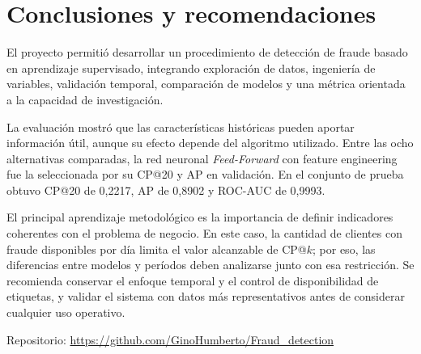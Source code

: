 \section{Conclusiones y recomendaciones}

El proyecto permitió desarrollar un procedimiento de detección de fraude basado en aprendizaje supervisado, integrando exploración de datos, ingeniería de variables, validación temporal, comparación de modelos y una métrica orientada a la capacidad de investigación.

La evaluación mostró que las características históricas pueden aportar información útil, aunque su efecto depende del algoritmo utilizado. Entre las ocho alternativas comparadas, la red neuronal \textit{Feed-Forward} con feature engineering fue la seleccionada por su CP@20 y AP en validación. En el conjunto de prueba obtuvo CP@20 de 0,2217, AP de 0,8902 y ROC-AUC de 0,9993.

El principal aprendizaje metodológico es la importancia de definir indicadores coherentes con el problema de negocio. En este caso, la cantidad de clientes con fraude disponibles por día limita el valor alcanzable de CP@$k$; por eso, las diferencias entre modelos y períodos deben analizarse junto con esa restricción. Se recomienda conservar el enfoque temporal y el control de disponibilidad de etiquetas, y validar el sistema con datos más representativos antes de considerar cualquier uso operativo.

\begin{nota}
    Repositorio: \url{https://github.com/GinoHumberto/Fraud_detection}
\end{nota}